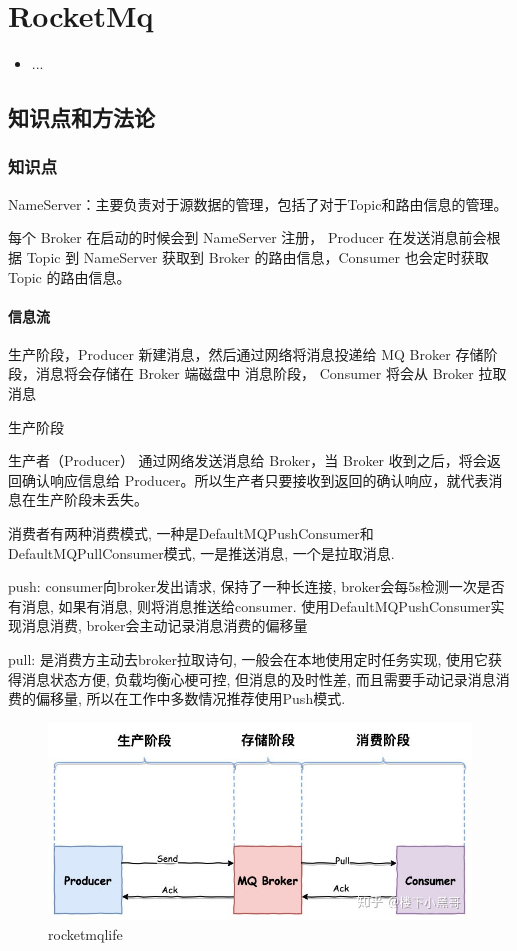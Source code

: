 \chapter{RocketMq}
\label{chap1}
\begin{itemize}[noitemsep,topsep=0pt,parsep=0pt,partopsep=0pt]
	\item ...
\end{itemize}

\section{知识点和方法论}

\subsection{知识点}
NameServer：主要负责对于源数据的管理，包括了对于Topic和路由信息的管理。

每个 Broker 在启动的时候会到 NameServer 注册，
Producer 在发送消息前会根据 Topic 到 NameServer 获取到 Broker 的路由信息，Consumer 也会定时获取 Topic 的路由信息。


\subsubsection{信息流}
生产阶段，Producer 新建消息，然后通过网络将消息投递给 MQ Broker
存储阶段，消息将会存储在 Broker 端磁盘中
消息阶段， Consumer 将会从 Broker 拉取消息

生产阶段

生产者（Producer） 通过网络发送消息给 Broker，当 Broker 收到之后，将会返回确认响应信息给 Producer。所以生产者只要接收到返回的确认响应，就代表消息在生产阶段未丢失。

消费者有两种消费模式, 一种是DefaultMQPushConsumer和DefaultMQPullConsumer模式, 一是推送消息, 一个是拉取消息.

push: consumer向broker发出请求, 保持了一种长连接, broker会每5s检测一次是否有消息, 如果有消息, 则将消息推送给consumer. 使用DefaultMQPushConsumer实现消息消费, broker会主动记录消息消费的偏移量

pull: 是消费方主动去broker拉取诗句, 一般会在本地使用定时任务实现, 使用它获得消息状态方便, 负载均衡心梗可控, 但消息的及时性差, 而且需要手动记录消息消费的偏移量, 所以在工作中多数情况推荐使用Push模式.



\begin{figure}
	\centering
	\includegraphics[width=0.7\linewidth]{figures/rocketmqlife.jpg}
	\caption{rocketmqlife}
	\label{fig:rocketmqlife}
\end{figure}


